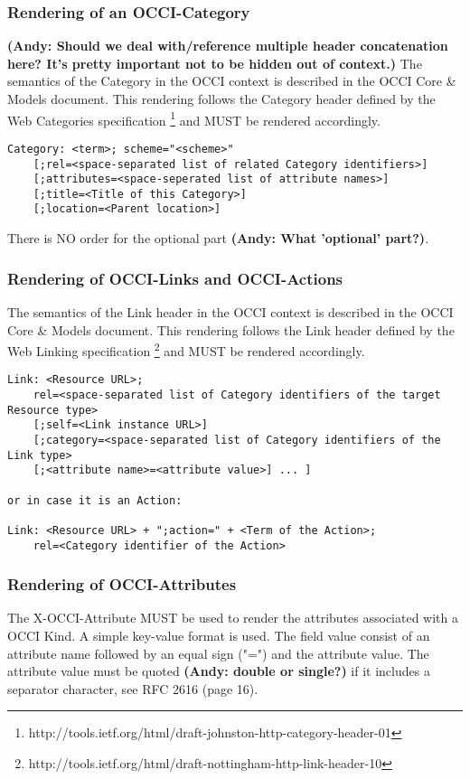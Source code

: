 \documentclass[10pt,a4paper]{article}
\begin{document}
\subsubsection{Rendering of an OCCI-Category}
\textbf{(Andy: Should we deal with/reference multiple header concatenation here? 
It's pretty important not to be hidden out of context.)}
The semantics of the Category in the OCCI context is described in the
OCCI Core \& Models document. This rendering follows the
  Category header defined by the Web Categories specification
  \footnote{http://tools.ietf.org/html/draft-johnston-http-category-header-01} 
  and MUST be rendered accordingly.

\begin{verbatim}
Category: <term>; scheme="<scheme>"
    [;rel=<space-separated list of related Category identifiers>]
    [;attributes=<space-seperated list of attribute names>]
    [;title=<Title of this Category>]    
    [;location=<Parent location>]
\end{verbatim}
There is NO order for the optional part \textbf{(Andy: What 'optional' part?)}.

\subsubsection{Rendering of OCCI-Links and OCCI-Actions}
The semantics of the Link header in the OCCI context is described in
the OCCI Core \& Models document. This rendering follows the
  Link header defined by the Web Linking specification
  \footnote{http://tools.ietf.org/html/draft-nottingham-http-link-header-10} and
  MUST be rendered accordingly.

\begin{verbatim}
Link: <Resource URL>;
    rel=<space-separated list of Category identifiers of the target Resource type>
    [;self=<Link instance URL>]
    [;category=<space-separated list of Category identifiers of the Link type>
    [;<attribute name>=<attribute value>] ... ]

or in case it is an Action:

Link: <Resource URL> + ";action=" + <Term of the Action>;
    rel=<Category identifier of the Action>
\end{verbatim}

\subsubsection{Rendering of OCCI-Attributes}
The X-OCCI-Attribute MUST be used to render the attributes associated
with a OCCI Kind. A simple key-value format is used. The field value
consist of an attribute name followed by an equal sign ("=") and the
attribute value. The attribute value must be quoted \textbf{(Andy: double or single?)} if it includes a
separator character, see RFC 2616 (page 16).
\end{document}
